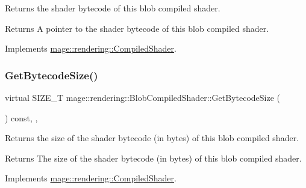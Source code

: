 Returns the shader bytecode of this blob compiled shader.

\begin{DoxyReturn}{Returns}
A pointer to the shader bytecode of this blob compiled shader. 
\end{DoxyReturn}


Implements \mbox{\hyperlink{classmage_1_1rendering_1_1_compiled_shader_a6067250341f428be19ed2aa9955a10b6}{mage\+::rendering\+::\+Compiled\+Shader}}.

\mbox{\label{classmage_1_1rendering_1_1_blob_compiled_shader_ac3c3edb09ba96367f8c5d6741ec03041}} 
\subsubsection{\texorpdfstring{Get\+Bytecode\+Size()}{GetBytecodeSize()}}
{\footnotesize\ttfamily virtual S\+I\+Z\+E\+\_\+T mage\+::rendering\+::\+Blob\+Compiled\+Shader\+::\+Get\+Bytecode\+Size (\begin{DoxyParamCaption}{ }\end{DoxyParamCaption}) const\hspace{0.3cm}{\ttfamily [override]}, {\ttfamily [virtual]}, {\ttfamily [noexcept]}}

Returns the size of the shader bytecode (in bytes) of this blob compiled shader.

\begin{DoxyReturn}{Returns}
The size of the shader bytecode (in bytes) of this blob compiled shader. 
\end{DoxyReturn}


Implements \mbox{\hyperlink{classmage_1_1rendering_1_1_compiled_shader_a92c17b46242bf884c3d0d673e88a292d}{mage\+::rendering\+::\+Compiled\+Shader}}.

\mbox{\label{classmage_1_1rendering_1_1_blob_compiled_shader_a07f7bf56354508ad499133b821e2fdc5}} 
